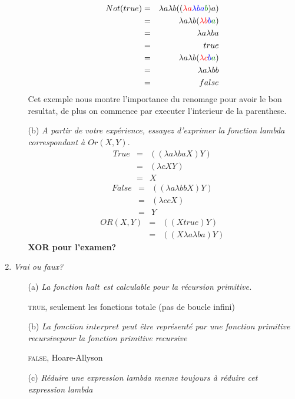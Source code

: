 \documentclass[a4paper,11pt,onecolumn]{article}
\begin{document}
\begin{enumerate}
\begin{itemize}
	\begin{eqnarray}
		Not(true) &=& \lambda a \lambda b ((\color{red}\lambda a \color{blue}\lambda ba \color{green}b\color{black}) a)\\
		&=& \lambda a \lambda b (\color{red}\lambda b\color{blue}b\color{green}a\color{black})\\
		&=& \lambda a \lambda ba\\
		&=& true\\
		&=& \lambda a \lambda b (\color{red}\lambda c\color{blue}b\color{green}a\color{black})\\
		&=& \lambda a \lambda bb \\
		&=& false
	\end{eqnarray}
	Cet exemple nous montre l'importance du renomage pour avoir le bon resultat, de plus on commence par executer l'interieur de la parenthese.
	\item[(b)]\textit{A partir de votre expérience, essayez d'exprimer la fonction lambda correspondant à $Or(X,Y)$}.
	\begin{eqnarray*}
		True &=& ((\lambda a \lambda ba X)Y)\\
		&=& (\lambda c XY) \\
		&=& X
	\end{eqnarray*}	
	\begin{eqnarray*}
		False &=& ((\lambda a \lambda bb X)Y)\\
		&=& (\lambda cc X) \\
		&=& Y
	\end{eqnarray*}
	\begin{eqnarray*}
		OR(X,Y) &=& ((X true) Y) \\
		&=& ((X \lambda a \lambda ba)Y)
	\end{eqnarray*}
	\textbf{XOR pour l'examen?}
\end{itemize}
	\item \textit{Vrai ou faux?}
	\begin{itemize}
		\item[(a)] \textit{La fonction $halt$ est calculable pour la récursion primitive.}
		
\textsc{true}, seulement les fonctions totale (pas de boucle infini)

		\item[(b)] \textit{La fonction $interpret$ peut être représenté par une fonction primitive recursivepour la fonction primitive recursive}

\textsc{false}, Hoare-Allyson

		\item[(c)] \textit{Réduire une expression lambda menne toujours à réduire cet expression lambda}


\end{itemize}
\end{enumerate}
\end{document}
